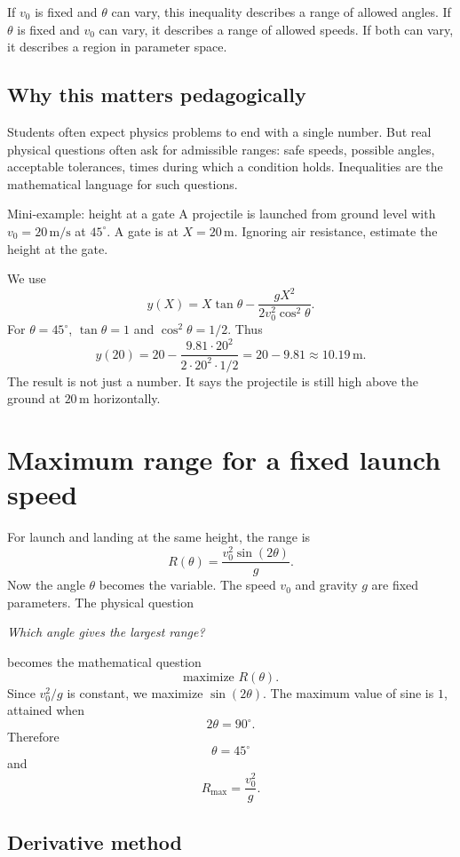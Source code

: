 \documentclass[11pt,a4paper]{article}
\begin{document}
If $v_0$ is fixed and $\theta$ can vary, this inequality describes a range of allowed angles. If $\theta$ is fixed and $v_0$ can vary, it describes a range of allowed speeds. If both can vary, it describes a region in parameter space.

\subsection{Why this matters pedagogically}

Students often expect physics problems to end with a single number. But real physical questions often ask for admissible ranges: safe speeds, possible angles, acceptable tolerances, times during which a condition holds. Inequalities are the mathematical language for such questions.

\begin{examplebox}{Mini-example: height at a gate}
A projectile is launched from ground level with $v_0=20\,\mathrm{m/s}$ at $45^\circ$. A gate is at $X=20\,\mathrm{m}$. Ignoring air resistance, estimate the height at the gate.

We use
\[
y(X)=X\tan\theta-\frac{gX^2}{2v_0^2\cos^2\theta}.
\]
For $\theta=45^\circ$, $\tan\theta=1$ and $\cos^2\theta=1/2$. Thus
\[
y(20)=20-\frac{9.81\cdot 20^2}{2\cdot 20^2\cdot 1/2}
=20-9.81\approx 10.19\,\mathrm{m}.
\]
The result is not just a number. It says the projectile is still high above the ground at $20\,\mathrm{m}$ horizontally.
\end{examplebox}

\section{Maximum range for a fixed launch speed}

For launch and landing at the same height, the range is
\[
R(\theta)=\frac{v_0^2\sin(2\theta)}{g}.
\]
Now the angle $\theta$ becomes the variable. The speed $v_0$ and gravity $g$ are fixed parameters. The physical question

\emph{Which angle gives the largest range?}

becomes the mathematical question
\[
\text{maximize } R(\theta).
\]
Since $v_0^2/g$ is constant, we maximize $\sin(2\theta)$. The maximum value of sine is $1$, attained when
\[
2\theta=90^\circ.
\]
Therefore
\[
\boxed{\theta=45^\circ}
\]
and
\[
\boxed{R_{\max}=\frac{v_0^2}{g}.}
\]

\subsection{Derivative method}
\end{document}
